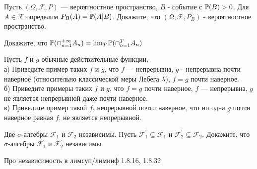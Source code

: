 \begin{solution}
\begin{solution}
\begin{solution}
\begin{solution}
\end{solution}

\begin{problem}
Пусть $(\Omega,\mathcal{F},P)$ --- вероятностное пространство, $B$ -
событие с $\P(B)>0$. Для $A\in \mathcal{F}$ определим
$P_{B}(A)=\P(A|B)$. Докажите, что $(\Omega,\mathcal{F},P_{B})$ -
вероятностное пространство. 
\end{problem} 
\begin{solution} 

\end{solution}

\begin{problem}
Докажите, что
$\P(\cap_{n=1}^{+\infty}A_{n})=\lim_{T}\P(\cap_{n=1}^{T}A_{n})$ 
\end{problem} 
\begin{solution} 

\end{solution}

\begin{problem}
Пусть $f$ и $g$ обычные действительные функции. \\
а) Приведите пример таких $f$ и $g$, что $f$ --- непрерывна, $g$ -
непрерывна почти наверное (относительно
классической меры Лебега $\lambda$), $f=g$ почти наверное. \\
б) Приведите примеры таких $f$ и $g$, что $f=g$ почти наверное,
$f$ --- непрерывна, $g$ не является непрерывной даже почти наверное. \\
в) Приведите пример такой $f$, непрерывной почти наверное, что ни
одна $g$ почти наверное равная $f$, не является непрерывной. 
\end{problem} 
\begin{solution} 

\end{solution}

\begin{problem}
Две $\sigma$-алгебры $\mathcal{F}_{1}$ и $\mathcal{F}_{2}$
независимы. Пусть $\mathcal{F}_{1}^{'}\subseteq \mathcal{F}_{1}$ и
$\mathcal{F}_{2}^{'}\subseteq \mathcal{F}_{2}$. Докажите, что
$\sigma$-алгебры $\mathcal{F}_{1}^{'}$ и $\mathcal{F}_{2}^{'}$
независимы. 
\end{problem} 
\begin{solution} 

\end{solution}

\begin{problem}
Про независимость в лимсуп/лиминф 1.8.16, 1.8.32 
\end{problem} 
\begin{solution} 


\end{solution}
\end{solution}
\end{solution}
\end{solution}

